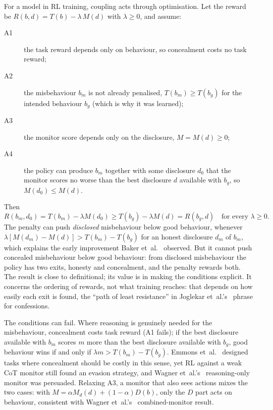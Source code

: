 \documentclass[review,12pt]{elsarticle}
\begin{document}
For a model in RL training, coupling acts through optimisation. Let the reward be \(R(b,d) = T(b) - \lambda\, M(d)\) with \(\lambda \ge 0\), and assume:

\begin{description}
\item[A1] the task reward depends only on behaviour, so concealment costs no task reward;
\item[A2] the misbehaviour $b_m$ is not already penalised, $T(b_m) \ge T(b_g)$ for the intended behaviour $b_g$ (which is why it was learned);
\item[A3] the monitor score depends only on the disclosure, $M = M(d) \ge 0$;
\item[A4] the policy can produce $b_m$ together with some disclosure $d_0$ that the monitor scores no worse than the best disclosure $d$ available with $b_g$, so $M(d_0) \le M(d)$.
\end{description}

Then
\begin{equation}
  R(b_m, d_0) = T(b_m) - \lambda M(d_0) \ge T(b_g) - \lambda M(d) = R(b_g, d) \quad \text{for every } \lambda \ge 0.
  \label{eq:ordering}
\end{equation}
The penalty can push \emph{disclosed} misbehaviour below good behaviour, whenever \(\lambda [M(d_m) - M(d)] > T(b_m) - T(b_g)\) for an honest disclosure \(d_m\) of \(b_m\), which explains the early improvement Baker et~al.~\cite{baker2025} observed. But it cannot push concealed misbehaviour below good behaviour: from disclosed misbehaviour the policy has two exits, honesty and concealment, and the penalty rewards both. The result is close to definitional; its value is in making the conditions explicit. It concerns the ordering of rewards, not what training reaches: that depends on how easily each exit is found, the ``path of least resistance'' in Joglekar et~al.'s~\cite{joglekar2025} phrase for confessions.

The conditions can fail. Where reasoning is genuinely needed for the misbehaviour, concealment costs task reward (A1 fails); if the best disclosure available with \(b_m\) scores \(m\) more than the best disclosure available with \(b_g\), good behaviour wins if and only if \(\lambda m > T(b_m) - T(b_g)\). Emmons et~al.~\cite{emmons2025} designed tasks where concealment should be costly in this sense, yet RL against a weak CoT monitor still found an evasion strategy, and Wagner et~al.'s~\cite{wagner2025} reasoning-only monitor was persuaded. Relaxing A3, a monitor that also sees actions mixes the two cases: with \(M = \alpha M_d(d) + (1-\alpha) D(b)\), only the \(D\) part acts on behaviour, consistent with Wagner et~al.'s~\cite{wagner2025} combined-monitor result.
\end{document}
